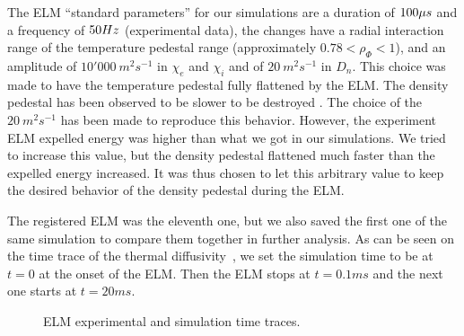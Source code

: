 The ELM ``standard parameters'' for our simulations are a duration of $100\mu s$ and a frequency of $50 Hz$ (experimental data), the changes have a radial interaction range of the temperature pedestal range (approximately $0.78 < \rho_{\Phi} < 1$), and an amplitude of $10'000\ m^2 s^{-1}$ in $\chi_e$ and $\chi_i$ and of $20\ m^2 s^{-1}$ in $D_n$. This choice was made to have the temperature pedestal fully flattened by the ELM. The density pedestal has been observed to be slower to be destroyed \cite{andreas2010}. The choice of the $20\ m^2 s^{-1}$ has been made to reproduce this behavior. However, the experiment ELM expelled energy was higher than what we got in our simulations. We tried to increase this value, but the density pedestal flattened much faster than the expelled energy increased. It was thus chosen to let this arbitrary value to keep the desired behavior of the density pedestal during the ELM.

The registered ELM was the eleventh one, but we also saved the first one of the same simulation to compare them together in further analysis. As can be seen on the time trace of the thermal diffusivity~, we set the simulation time to be at $t = 0$ at the onset of the ELM. Then the ELM stops at $t = 0.1ms$ and the next one starts at $t = 20ms$.

\begin{figure}[H]
\vspace{-2mm}
\begin{center}
\hspace{3mm}
\vspace{-8mm}
\end{center}
\caption{\footnotesize ELM experimental and simulation time traces.}%
\vspace{-5mm}
\end{figure}
